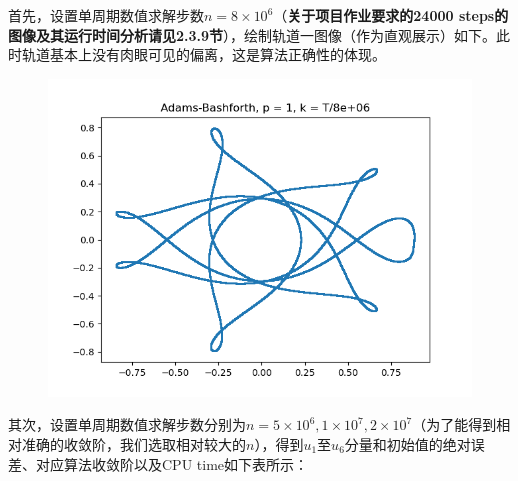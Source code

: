 \documentclass{ctexart}
\begin{document}
\begin{sloppypar}
首先，设置单周期数值求解步数$n = 8 \times 10^6$（\textbf{关于项目作业要求的24000 steps的图像及其运行时间分析请见2.3.9节}），绘制轨道一图像（作为直观展示）如下。此时轨道基本上没有肉眼可见的偏离，这是算法正确性的体现。
\begin{figure}[H]
\centering
\includegraphics[scale = 0.45]{./report_src/Figure_40.png}
\end{figure}
其次，设置单周期数值求解步数分别为$n = 5 \times 10^6,1 \times 10^7, 2 \times 10^7$（为了能得到相对准确的收敛阶，我们选取相对较大的$n$），得到$u_1$至$u_6$分量和初始值的绝对误差、对应算法收敛阶以及CPU time如下表所示：


\end{sloppypar}
\end{document}

